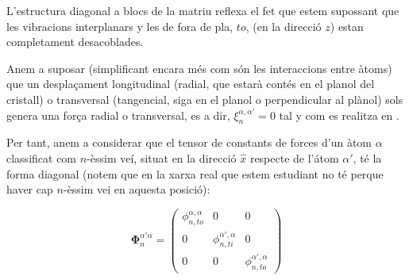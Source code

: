 \documentclass[12pt]{article} %
\let\vec\mathbf %
\begin{document}
L'estructura diagonal a blocs de la matriu reflexa el fet que estem supossant que  les vibracions interplanars y les de fora de pla, $to$, (en la direcció $z$) estan completament desacoblades.

Anem a suposar (simplificant encara més com són les interaccions entre àtoms) que un despla\c{c}ament longitudinal (radial, que estarà contés en el planol del cristall) o transversal (tangencial, siga en el planol o perpendicular al plànol) sols genera una for\c{c}a radial o transversal, es a dir, $\xi_n^{\alpha,\alpha'}=0$ tal y com es realitza en \cite{Balkanski_2000}. %






Per tant, anem a considerar que el tensor de constants de forces  d'un àtom $\alpha$ classificat com $n$-èssim veí, situat en la direcció $\hat x$ respecte de l'átom  $\alpha'$, té la forma diagonal (notem que en la xarxa real que estem estudiant no té perque haver cap $n$-èssim vei en aquesta posició):

\begin{equation}
\vec\Phi_n^{\alpha'\alpha}=\begin{pmatrix}
\phi_{n,to}^{\alpha,\alpha}&0 &0\\
0& \phi_{n,ti}^{\alpha',\alpha} & 0 \\
0 & 0 & \phi_{n,to}^{\alpha',\alpha}
\end{pmatrix}
\label{eq:tensordeforcessimplificat}
\end{equation}
\end{document}
